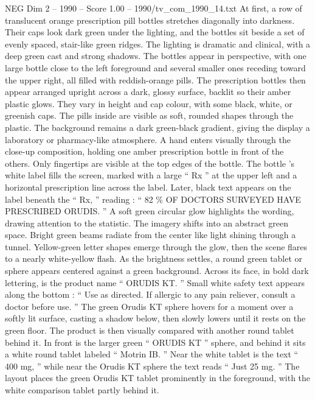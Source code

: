 \begin{textsample}{NEG Dim 2 – 1990 – Score 1.00 – 1990/tv\_com\_1990\_14.txt}  \label{ex:f2_neg_063}
At first, a row of translucent orange prescription pill bottles stretches diagonally into darkness.
Their caps look dark green under the lighting, and the bottles sit beside a set of evenly spaced, stair-like green ridges.
The lighting is dramatic and clinical, with a deep green cast and strong shadows.
The bottles appear in perspective, with one large bottle close to the left foreground and several smaller ones receding toward the upper right, all filled with reddish-orange pills.
The prescription bottles then appear arranged upright across a dark, glossy surface, backlit so their amber plastic glows.
They vary in height and cap colour, with some black, white, or greenish caps.
The pills inside are visible as soft, rounded shapes through the plastic.
The background remains a dark green-black gradient, giving the display a laboratory or pharmacy-like atmosphere.
A hand enters visually through the close-up composition, holding one amber prescription bottle in front of the others.
Only fingertips are visible at the top edges of the bottle.
The bottle ’s white label fills the screen, marked with a large “ Rx ” at the upper left and a horizontal prescription line across the label.
Later, black text appears on the label beneath the “ Rx, ” reading : “ 82 \% OF DOCTORS SURVEYED HAVE PRESCRIBED ORUDIS. ” A soft green circular glow highlights the wording, drawing attention to the statistic.
The imagery shifts into an abstract green space.
Bright green beams radiate from the center like light shining through a tunnel.
Yellow-green letter shapes emerge through the glow, then the scene flares to a nearly white-yellow flash.
As the brightness settles, a round green tablet or sphere appears centered against a green background.
Across its face, in bold dark lettering, is the product name “ ORUDIS KT. ” Small white safety text appears along the bottom : “ Use as directed.
If allergic to any pain reliever, consult a doctor before use. ” The green Orudis KT sphere hovers for a moment over a softly lit surface, casting a shadow below, then slowly lowers until it rests on the green floor.
The product is then visually compared with another round tablet behind it.
In front is the larger green “ ORUDIS KT ” sphere, and behind it sits a white round tablet labeled “ Motrin IB. ” Near the white tablet is the text “ 400 mg, ” while near the Orudis KT sphere the text reads “ Just 25 mg. ” The layout places the green Orudis KT tablet prominently in the foreground, with the white comparison tablet partly behind it.

\end{textsample}
